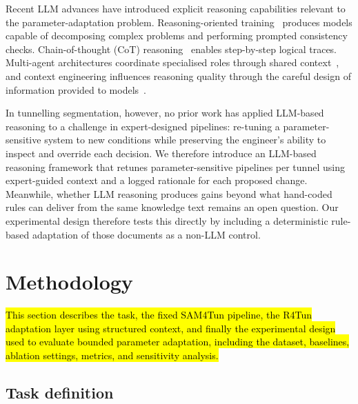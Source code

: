 \documentclass[a4paper,fleqn]{cas-dc}
\begin{document}
{Recent LLM advances have introduced explicit reasoning capabilities relevant to the parameter-adaptation problem. Reasoning-oriented training~\cite{ouyang2022training, deepseek2025analysis, chua2025deepseek, xiang2025metacot, openai2025o3, openai2025reasoningbestpractices} produces models capable of decomposing complex problems and performing prompted consistency checks. Chain-of-thought (CoT) reasoning~\cite{wei2023cot, kojima2023zeroshot} enables step-by-step logical traces. Multi-agent architectures coordinate specialised roles through shared context~\cite{hong2024metagpt, qian2024chatdev, chen2024comm, zhang2023igniting, zhang2024chain}, and context engineering influences reasoning quality through the careful design of information provided to models~\cite{xu2024retrieval, mei2025survey, anthropic2025context}.

In tunnelling segmentation, however, no prior work has applied LLM-based reasoning to a challenge in expert-designed pipelines: re-tuning a parameter-sensitive system to new conditions while preserving the engineer's ability to inspect and override each decision. We therefore introduce an LLM-based reasoning framework that retunes parameter-sensitive pipelines per tunnel using expert-guided context and a logged rationale for each proposed change. Meanwhile, whether LLM reasoning produces gains beyond what hand-coded rules can deliver from the same knowledge text remains an open question. Our experimental design therefore tests this directly by including a deterministic rule-based adaptation of those documents as a non-LLM control.




\section{Methodology}\label{sec:methods}

\hl{This section describes the task, the fixed SAM4Tun pipeline, the R4Tun adaptation layer using structured context, and finally the experimental design used to evaluate bounded parameter adaptation, including the dataset, baselines, ablation settings, metrics, and sensitivity analysis.}

\subsection{Task definition}\label{sec:problem-def}

}
\end{document}
